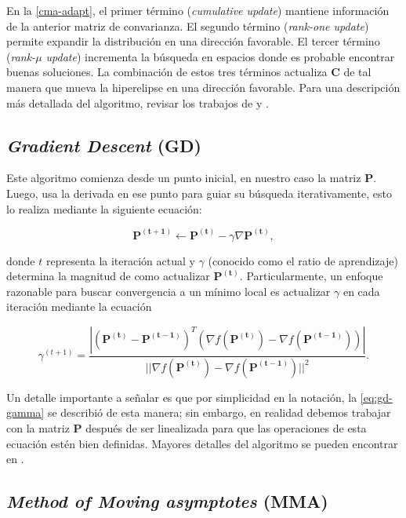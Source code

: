 En la \autoref{cma-adapt}, el primer término (\emph{cumulative update}) 
mantiene información de la anterior matriz de convarianza.
El segundo término (\emph{rank-one update}) permite expandir la distribución en
una dirección favorable.
El tercer término (\emph{rank-$\mu$ update}) incrementa la búsqueda en espacios
donde es probable encontrar buenas soluciones.
La combinación de estos tres términos actualiza $\boldsymbol{C}$ de tal manera que
mueva la hiperelipse en una dirección favorable. 
Para una descripción más detallada del algoritmo, revisar los trabajos de \cite{Hansen2016} y \cite{Mykel2019}.

\subsection{\emph{Gradient Descent} (GD)}\label{sec:gradient-descent}

Este algoritmo comienza desde un punto inicial, en nuestro caso la matriz $\boldsymbol{P}$.
Luego, usa la derivada en ese punto para guiar su búsqueda iterativamente, 
esto lo realiza mediante la siguiente ecuación:

\begin{equation}
  \boldsymbol{P^{(t+1)}} \gets \boldsymbol{P^{(t)}} - \gamma \nabla \boldsymbol{P^{(t)}},
  \label{eq:gd-point}
\end{equation}

donde $t$ representa la iteración actual y $\gamma$ (conocido como el ratio de aprendizaje)
determina la magnitud de como actualizar $\boldsymbol{P^{(t)}}$. 
Particularmente, un enfoque razonable para buscar convergencia a 
un mínimo local es actualizar $\gamma$ en cada iteración mediante la ecuación

\begin{equation}
  \gamma^{(t+1)} = \frac{|(\boldsymbol{P^{(t)}}-\boldsymbol{P^{(t-1)}})^T(\nabla f(\boldsymbol{P^{(t)}})-\nabla f(\boldsymbol{P^{(t-1)}}))|}
  {||\nabla f(\boldsymbol{P^{(t)}})-\nabla f(\boldsymbol{P^{(t-1)}})||^2}.
  \label{eq:gd-gamma}
\end{equation}

Un detalle importante a señalar es que por simplicidad en la notación, 
la \autoref{eq:gd-gamma} se describió de esta manera;
sin embargo, en realidad debemos trabajar con la matriz $\boldsymbol{P}$ después de ser linealizada
para que las operaciones de esta ecuación estén bien definidas.
Mayores detalles del algoritmo se pueden encontrar en \cite{Demidova2020}.


\subsection{\emph{Method of Moving asymptotes} (MMA)}\label{sec:mma}

